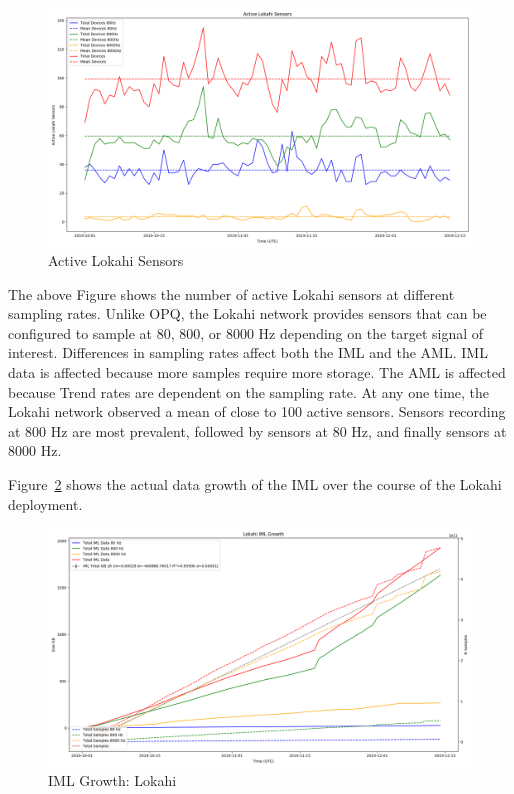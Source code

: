 \begin{figure}[H]
    \centering
    \includegraphics[width=\linewidth]{figures/lokahi_num_sensors.png}
    \caption{Active Lokahi Sensors}
    \label{fig:active_lokahi_sensors}
\end{figure}

The above Figure shows the number of active Lokahi sensors at different sampling rates. Unlike OPQ, the Lokahi network provides sensors that can be configured to sample at 80, 800, or 8000 Hz depending on the target signal of interest. Differences in sampling rates affect both the IML and the AML. IML data is affected because more samples require more storage. The AML is affected because Trend rates are dependent on the sampling rate. At any one time, the Lokahi network observed a mean of close to 100 active sensors. Sensors recording at 800 Hz are most prevalent, followed by sensors at 80 Hz, and finally sensors at 8000 Hz.

Figure~\ref{fig:lokahi_actual_iml} shows the actual data growth of the IML over the course of the Lokahi deployment.

\begin{figure}[H]
    \centering
    \includegraphics[width=\linewidth]{figures/lokahi_actual_iml.png}
    \caption{IML Growth: Lokahi}
    \label{fig:lokahi_actual_iml}
\end{figure}

